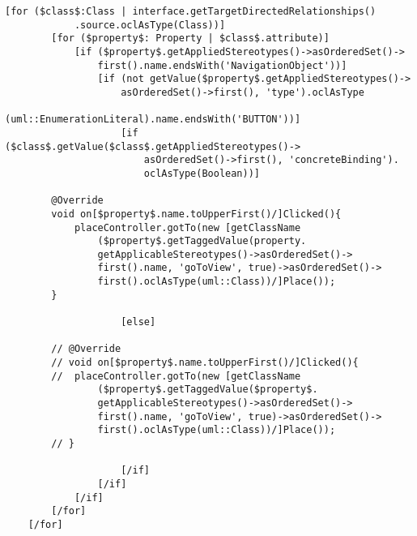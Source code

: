 \begin{lstlisting}[caption={Auszug der Generieung der \texttt{on'Name'Clicked}-Methode}, label={BSPCodeClick}]
[for ($class$:Class | interface.getTargetDirectedRelationships()
			.source.oclAsType(Class))]
		[for ($property$: Property | $class$.attribute)]
			[if ($property$.getAppliedStereotypes()->asOrderedSet()->
				first().name.endsWith('NavigationObject'))]
				[if (not getValue($property$.getAppliedStereotypes()->
					asOrderedSet()->first(), 'type').oclAsType
					(uml::EnumerationLiteral).name.endsWith('BUTTON'))]
					[if ($class$.getValue($class$.getAppliedStereotypes()->
						asOrderedSet()->first(), 'concreteBinding').
						oclAsType(Boolean))]
						
		@Override
		void on[$property$.name.toUpperFirst()/]Clicked(){
			placeController.gotTo(new [getClassName
				($property$.getTaggedValue(property.
				getApplicableStereotypes()->asOrderedSet()->
				first().name, 'goToView', true)->asOrderedSet()->
				first().oclAsType(uml::Class))/]Place());
		}

					[else]

		// @Override
		// void on[$property$.name.toUpperFirst()/]Clicked(){
		//	placeController.gotTo(new [getClassName
				($property$.getTaggedValue($property$.
				getApplicableStereotypes()->asOrderedSet()->
				first().name, 'goToView', true)->asOrderedSet()->
				first().oclAsType(uml::Class))/]Place());
		// }

					[/if]
				[/if]
			[/if]
		[/for]
	[/for]
\end{lstlisting}

